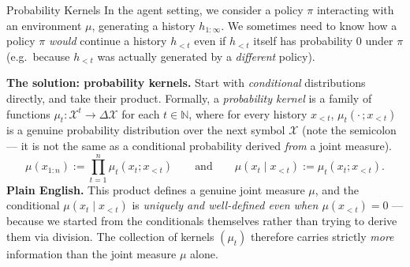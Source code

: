\documentclass[aspectratio=169,10pt]{beamer}
\begin{document}
\begin{frame}{Probability Kernels}
  In the agent setting, we consider a policy $\pi$ interacting with an
  environment $\mu$, generating a history $h_{1:\infty}$. We sometimes need
  to know how a policy $\pi$ \emph{would} continue a history $h_{<t}$ even
  if $h_{<t}$ itself has probability $0$ under $\pi$ (e.g.\ because
  $h_{<t}$ was actually generated by a \emph{different} policy).

  \textbf{The solution: probability kernels.} Start with \emph{conditional}
  distributions directly, and take their product. Formally, a
  \emph{probability kernel} is a family of functions
  $\mu_t: \mathcal{X}^t \to \Delta\mathcal{X}$ for each $t\in\mathbb{N}$,
  where for every history $x_{<t}$, $\mu_t(\cdot\,;x_{<t})$ is a genuine
  probability distribution over the next symbol $\mathcal{X}$ (note the
  semicolon --- it is not the same as a conditional probability derived
  \emph{from} a joint measure).
  \[
    \mu(x_{1:n}) := \prod_{t=1}^n \mu_t(x_t; x_{<t})
    \qquad \text{and} \qquad
    \mu(x_t\mid x_{<t}) := \mu_t(x_t; x_{<t}).
  \]
  \textbf{Plain English.} This product defines a genuine joint measure
  $\mu$, and the conditional $\mu(x_t\mid x_{<t})$ is \emph{uniquely and
  well-defined even when $\mu(x_{<t})=0$} --- because we started from the
  conditionals themselves rather than trying to derive them via division.
  The collection of kernels $(\mu_t)$ therefore carries strictly \emph{more}
  information than the joint measure $\mu$ alone.
\end{frame}
\end{document}
